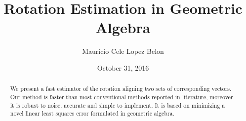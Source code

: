 \documentclass{birkjour}
\numberwithin{equation}{section}
\begin{document}
%
%
%
%
%
%
%
%
%


\title[Rotation Estimation in Geometric Algebra]
 {Rotation Estimation in Geometric Algebra}

\author[Mauricio Cele Lopez Belon]{Mauricio Cele Lopez Belon}
\address{Buenos Aires, Argentina}



\date{October 31, 2016}

\begin{abstract}

We present a fast estimator of the rotation aligning two sets of corresponding vectors. Our method is faster than most conventional methods reported in literature, moreover it is robust to noise, accurate and simple to implement. It is based on minimizing a novel linear least squares error formulated in geometric algebra.

\end{abstract}

\maketitle
\end{document}
